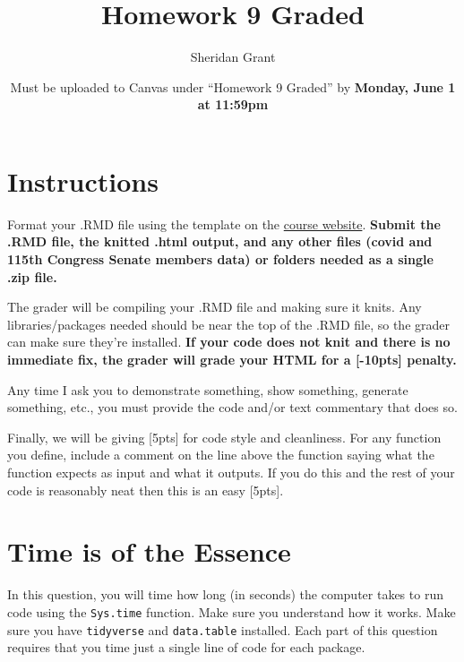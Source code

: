 \documentclass[12pt]{article}
\title{Homework 9 Graded}
\author{Sheridan Grant}
\date{Must be uploaded to Canvas under ``Homework 9 Graded'' by \textbf{Monday, June 1 at 11:59pm}}
\begin{document}
\sloppy

\maketitle

\section*{Instructions}

Format your .RMD file using the template on the \href{https://sheridanlgrant.github.io/teaching/STAT302_SPR2020}{course website}. \textbf{Submit the .RMD file, the knitted .html output, and any other files (covid and 115th Congress Senate members data) or folders needed as a single .zip file.}

The grader will be compiling your .RMD file and making sure it knits. Any libraries/packages needed should be near the top of the .RMD file, so the grader can make sure they're installed. \textbf{If your code does not knit and there is no immediate fix, the grader will grade your HTML for a [-10pts] penalty.}

Any time I ask you to demonstrate something, show something, generate something, etc., you must provide the code and/or text commentary that does so.

Finally, we will be giving [5pts] for code style and cleanliness. For any function you define, include a comment on the line above the function saying what the function expects as input and what it outputs. If you do this and the rest of your code is reasonably neat then this is an easy [5pts].

\section{Time is of the Essence}

In this question, you will time how long (in seconds) the computer takes to run code using the \verb|Sys.time| function. Make sure you understand how it works. Make sure you have \verb|tidyverse| and \verb|data.table| installed. Each part of this question requires that you time just a single line of code for each package.
\end{document}
